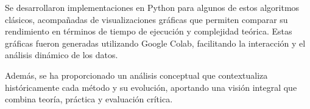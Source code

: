 Se desarrollaron implementaciones en Python para algunos de estos algoritmos clásicos, acompañadas de visualizaciones gráficas que permiten comparar su rendimiento en términos de tiempo de ejecución y complejidad teórica. Estas gráficas fueron generadas utilizando Google Colab, facilitando la interacción y el análisis dinámico de los datos.

Además, se ha proporcionado un análisis conceptual que contextualiza históricamente cada método y su evolución, aportando una visión integral que combina teoría, práctica y evaluación crítica.




